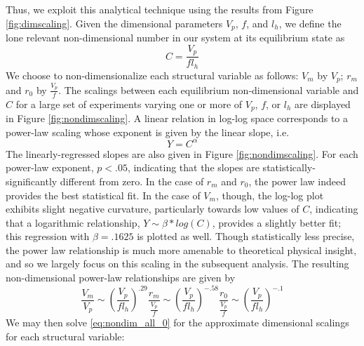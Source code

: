 \documentclass[12pt]{article}
\begin{document}
Thus, we exploit this analytical technique using the results from Figure \ref{fig:dimscaling}. Given the dimensional parameters $V_p$, $f$, and $l_h$, we define the lone relevant non-dimensional number in our system at its equilibrium state as
\begin{equation}
\label{eq:nondim}
C = \frac{V_p}{fl_h}
\end{equation}
We choose to non-dimensionalize each structural variable as follows: $V_m$ by $V_p$; $r_m$ and $r_0$ by $\frac{V_p}{f}$. The scalings between each equilibrium non-dimensional variable and $C$ for a large set of experiments varying one or more of $V_p$, $f$, or $l_h$ are displayed in Figure \ref{fig:nondimscaling}.  A linear relation in log-log space corresponds to a power-law scaling whose exponent is given by the linear slope, i.e.
\begin{equation}
\label{eq:buckpipowerlaw}
Y = C^\alpha
\end{equation}
The linearly-regressed slopes are also given in Figure \ref{fig:nondimscaling}. For each power-law exponent, $p<.05$, indicating that the slopes are statistically-significantly different from zero. In the case of $r_m$ and $r_0$, the power law indeed provides the best statistical fit. In the case of $V_m$, though, the log-log plot exhibits slight negative curvature, particularly towards low values of $C$, indicating that a logarithmic relationship, $Y \sim \beta*log(C)$, provides a slightly better fit; this regression with $\beta = .1625$ is plotted as well.  Though statistically less precise, the power law relationship is much more amenable to theoretical physical insight, and so we largely focus on this scaling in the subsequent analysis. The resulting non-dimensional power-law relationships are given by
\begin{subequations}
\label{eq:nondim_all_0}
\begin{equation}
\label{eq:nondim_Vm_0}
\frac{V_m}{V_p} \sim \left(\frac{V_p}{fl_h}\right)^{.29}
\end{equation}
\begin{equation}
\label{eq:nondim_rm_0}
\frac{r_m}{\frac{V_p}{f}} \sim \left(\frac{V_p}{fl_h}\right)^{-.58}
\end{equation}
\begin{equation}
\label{eq:nondim_r0_0}
\frac{r_0}{\frac{V_p}{f}} \sim \left(\frac{V_p}{fl_h}\right)^{-.1}
\end{equation}
\end{subequations}
We may then solve \eqref{eq:nondim_all_0} for the approximate dimensional scalings for each structural variable:
\end{document}
